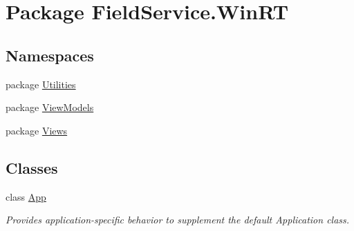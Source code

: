 \hypertarget{namespace_field_service_1_1_win_r_t}{\section{Package Field\+Service.\+Win\+R\+T}
\label{namespace_field_service_1_1_win_r_t}
}
\subsection*{Namespaces}
\begin{DoxyCompactItemize}
\item 
package \hyperlink{namespace_field_service_1_1_win_r_t_1_1_utilities}{Utilities}
\item 
package \hyperlink{namespace_field_service_1_1_win_r_t_1_1_view_models}{View\+Models}
\item 
package \hyperlink{namespace_field_service_1_1_win_r_t_1_1_views}{Views}
\end{DoxyCompactItemize}
\subsection*{Classes}
\begin{DoxyCompactItemize}
\item 
class \hyperlink{class_field_service_1_1_win_r_t_1_1_app}{App}
\begin{DoxyCompactList}\small\item\em Provides application-\/specific behavior to supplement the default Application class. \end{DoxyCompactList}\end{DoxyCompactItemize}
